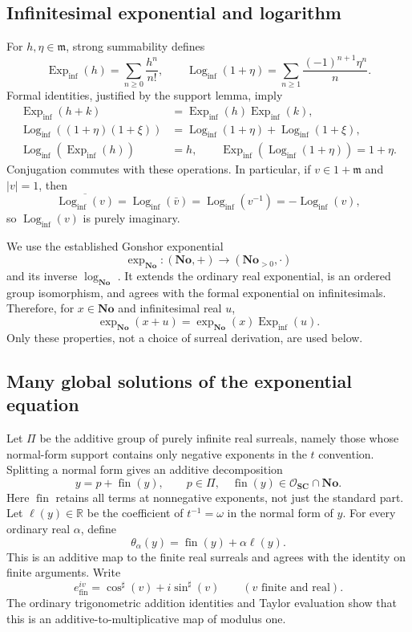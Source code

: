 \documentclass[11pt,letterpaper]{article}
\theoremstyle{definition}
\theoremstyle{remark}
\newcommand{\No}{\mathbf{No}}
\newcommand{\SC}{\mathbf{SC}}
\newcommand{\R}{\mathbb R}
\newcommand{\OO}{\mathcal O}
\newcommand{\mm}{\mathfrak m}
\newcommand{\fin}{\operatorname{fin}}
\newcommand{\Logi}{\operatorname{Log}_{\mathrm{inf}}}
\newcommand{\Expi}{\operatorname{Exp}_{\mathrm{inf}}}
\newcommand{\sh}{^{\sharp}}
\numberwithin{equation}{section}
\begin{document}
\subsection{Infinitesimal exponential and logarithm}
For $h,\eta\in\mm$, strong summability defines
\[
 \Expi(h)=\sum_{n\ge0}\frac{h^n}{n!},\qquad
 \Logi(1+\eta)=\sum_{n\ge1}\frac{(-1)^{n+1}\eta^n}{n}.
\]
Formal identities, justified by the support lemma, imply
\begin{align*}
 \Expi(h+k)&=\Expi(h)\Expi(k),\\
 \Logi((1+\eta)(1+\xi))
 &=\Logi(1+\eta)+\Logi(1+\xi),\\
 \Logi(\Expi(h))&=h,\qquad
 \Expi(\Logi(1+\eta))=1+\eta.
\end{align*}
Conjugation commutes with these operations. In particular, if $v\in1+\mm$ and $|v|=1$, then
\[
 \overline{\Logi(v)}=\Logi(\bar v)
 =\Logi(v^{-1})=-\Logi(v),
\]
so $\Logi(v)$ is purely imaginary.

We use the established Gonshor exponential
\[
 \exp_{\No}:(\No,+)\longrightarrow(\No_{>0},\cdot)
\]
and its inverse $\log_{\No}$ \cite{Gonshor,vdDE}. It extends the ordinary real exponential, is an ordered group isomorphism, and agrees with the formal exponential on infinitesimals. Therefore, for $x\in\No$ and infinitesimal real $u$,
\begin{equation}\label{eq:Gonshorlocal}
 \exp_{\No}(x+u)=\exp_{\No}(x)\Expi(u).
\end{equation}
Only these properties, not a choice of surreal derivation, are used below.

\subsection{Many global solutions of the exponential equation}
Let $\Pi$ be the additive group of purely infinite real surreals, namely those whose normal-form support contains only negative exponents in the $t$ convention. Splitting a normal form gives an additive decomposition
\[
 y=p+\fin(y),\qquad p\in\Pi,
 \quad \fin(y)\in\OO_{\SC}\cap\No.
\]
Here $\fin$ retains all terms at nonnegative exponents, not just the standard part. Let $\ell(y)\in\R$ be the coefficient of $t^{-1}=\omega$ in the normal form of $y$. For every ordinary real $\alpha$, define
\[
 \theta_\alpha(y)=\fin(y)+\alpha\ell(y).
\]
This is an additive map to the finite real surreals and agrees with the identity on finite arguments. Write
\[
 e^{iv}_{\mathrm{fin}}=\cos\sh(v)+i\sin\sh(v)
 \qquad(v\text{ finite and real}).
\]
The ordinary trigonometric addition identities and Taylor evaluation show that this is an additive-to-multiplicative map of modulus one.
\end{document}
